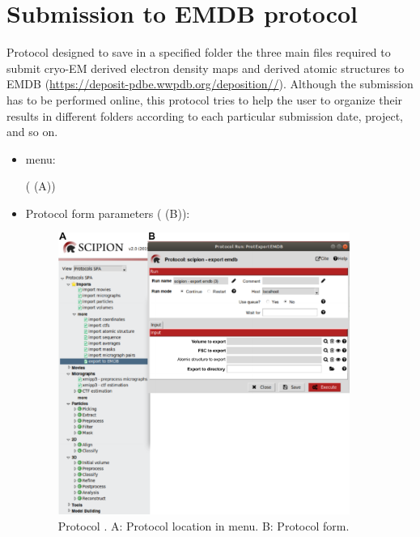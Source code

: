 \section{Submission to EMDB protocol}
\label{app:exportToEMDB}

Protocol designed to save in a specified folder the three main files required to submit cryo-EM derived electron density maps and derived atomic structures to EMDB (\url{https://deposit-pdbe.wwpdb.org/deposition//}). Although the submission has to be performed online, this protocol tries to help the user to organize their results in different folders according to each particular submission date, project, and so on.

 \begin{itemize}
  \item \scipion menu:
  
     ( (A))
  
  \item Protocol form parameters ( (B)):
  
    \begin{figure}[H]
     \centering 
     \captionsetup{width=.7\linewidth} 
     \includegraphics[width=0.90\textwidth]{Images_appendix/Fig156.pdf}
     \caption{Protocol . A: Protocol location in \scipion menu. B: Protocol form.}
     \label{fig:export_to_EMDB_1}
    \end{figure}
    

\end{itemize}
